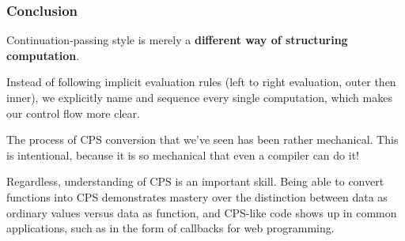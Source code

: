 \documentclass[aspectratio=169]{beamer}
\begin{document}
\begin{frame}[fragile]
  \frametitle{Conclusion}

  Continuation-passing style is merely a \textbf{different way of structuring
  computation}.

  \pause
  \vspace{\fill}

  Instead of following implicit evaluation rules (left to right evaluation,
  outer then inner), we explicitly name and sequence every single computation,
  which makes our control flow more clear.

  \pause
  \vspace{\fill}

  The process of CPS conversion that we've seen has been rather mechanical. This
  is intentional, because it is so mechanical that even a compiler can do it!

  \pause
  \vspace{\fill}

  Regardless, understanding of CPS is an important skill. Being able to convert functions
  into CPS demonstrates mastery over the distinction between data as
  ordinary values versus data as function, and CPS-like code shows up in common
  applications, such as in the form of callbacks for web programming.
\end{frame}



\thankyou

\end{document}
